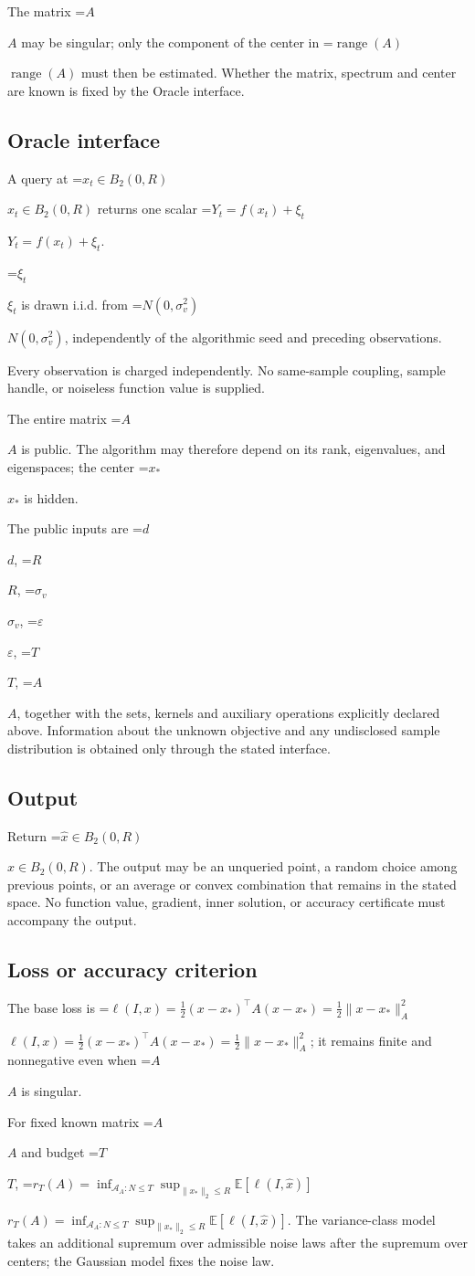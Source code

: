 \documentclass[10pt,a4paper]{article}
\newcommand{\AtlasMath}[1]{\par\begingroup\centering\setbox0=\hbox{$\displaystyle #1$}\ifdim\wd0>1.4\linewidth\typeout{ATLAS WIDE FORMULA: \the\wd0}\fi\ifdim\wd0>\linewidth\resizebox{\linewidth}{!}{\box0}\else\box0\fi\par\endgroup}
\newcommand{\AtlasInlineMath}[1]{\begingroup\setbox0=\hbox{$#1$}\ifdim\wd0>.4\linewidth\endgroup\AtlasMath{#1}\else\endgroup$#1$\fi}
\begin{document}
The matrix \AtlasInlineMath{A} may be singular; only the component of the center in \AtlasInlineMath{\operatorname{range}(A)} must then be estimated. Whether the matrix, spectrum and center are known is fixed by the Oracle interface.

\subsection{Oracle interface}
A query at \AtlasInlineMath{x_t\in B_2(0,R)} returns one scalar \AtlasInlineMath{Y_t=f(x_t)+\xi_t}.

\AtlasInlineMath{\xi_t} is drawn i.i.d. from \AtlasInlineMath{N(0,\sigma_v^2)}, independently of the algorithmic seed and preceding observations.

Every observation is charged independently. No same-sample coupling, sample handle, or noiseless function value is supplied.

The entire matrix \AtlasInlineMath{A} is public. The algorithm may therefore depend on its rank, eigenvalues, and eigenspaces; the center \AtlasInlineMath{x_*} is hidden.

The public inputs are \AtlasInlineMath{d}, \AtlasInlineMath{R}, \AtlasInlineMath{\sigma_v}, \AtlasInlineMath{\varepsilon}, \AtlasInlineMath{T}, \AtlasInlineMath{A}, together with the sets, kernels and auxiliary operations explicitly declared above. Information about the unknown objective and any undisclosed sample distribution is obtained only through the stated interface.

\subsection{Output}
Return \AtlasInlineMath{\widehat{x}\in B_2(0,R)}. The output may be an unqueried point, a random choice among previous points, or an average or convex combination that remains in the stated space. No function value, gradient, inner solution, or accuracy certificate must accompany the output.

\subsection{Loss or accuracy criterion}
The base loss is \AtlasInlineMath{\ell(I,x)=\frac12(x-x_*)^\top A(x-x_*)=\frac12\|x-x_*\|_A^2}; it remains finite and nonnegative even when \AtlasInlineMath{A} is singular.

For fixed known matrix \AtlasInlineMath{A} and budget \AtlasInlineMath{T}, \AtlasInlineMath{r_T(A)=\inf_{\mathcal{A}_A:N\le T}\sup_{\|x_*\|_2\le R}\mathbb{E}[\ell(I,\widehat{x})]}. The variance-class model takes an additional supremum over admissible noise laws after the supremum over centers; the Gaussian model fixes the noise law.
\end{document}
